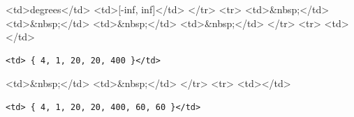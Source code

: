 \textless{}td\textgreater{}degrees\textless{}/td\textgreater{} \textless{}td\textgreater{}[-inf, inf]\textless{}/td\textgreater{} \textless{}/tr\textgreater{} \textless{}tr\textgreater{} \textless{}td\textgreater{}\&nbsp;\textless{}/td\textgreater{} \textless{}td\textgreater{}\&nbsp;\textless{}/td\textgreater{} \textless{}td\textgreater{}\&nbsp;\textless{}/td\textgreater{} \textless{}td\textgreater{}\&nbsp;\textless{}/td\textgreater{} \textless{}/tr\textgreater{} \textless{}tr\textgreater{} \textless{}td\textgreater{}\textless{}/td\textgreater{}

\begin{verbatim}
<td> { 4, 1, 20, 20, 400 }</td>
\end{verbatim}

\textless{}td\textgreater{}\&nbsp;\textless{}/td\textgreater{} \textless{}td\textgreater{}\&nbsp;\textless{}/td\textgreater{} \textless{}/tr\textgreater{} \textless{}tr\textgreater{} \textless{}td\textgreater{}\textless{}/td\textgreater{}

\begin{verbatim}
<td> { 4, 1, 20, 20, 400, 60, 60 }</td>
\end{verbatim}

